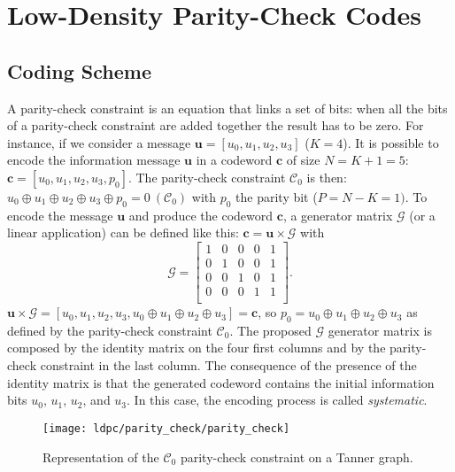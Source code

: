 \section{Low-Density Parity-Check Codes}

\subsection{Coding Scheme}

A parity-check constraint is an equation that links a set of bits: when all the
bits of a parity-check constraint are added together the result has to be
zero. For instance, if we consider a message $\bm{u} = [u_0, u_1, u_2, u_3]$
($K = 4$). It is possible to encode the information message $\bm{u}$ in a
codeword $\bm{c}$ of size $N = K + 1 = 5$: $\bm{c} = [u_0,u_1,u_2,u_3,p_0]$.
The parity-check constraint $\mathcal{C}_0$ is then: $u_0 \oplus u_1 \oplus u_2
\oplus u_3 \oplus p_0 = 0~(\mathcal{C}_0)$ with $p_0$ the parity bit ($P = N -
K = 1)$. To encode the message $\bm{u}$ and produce the codeword $\bm{c}$, a
generator matrix $\bm{\mathcal{G}}$ (or a linear application) can be defined
like this: $\bm{c} = \bm{u} \times \bm{\mathcal{G}}$ with
\begin{equation*}
\bm{\mathcal{G}} =
\begin{bmatrix}
1 & 0 & 0 & 0 & 1\\
0 & 1 & 0 & 0 & 1\\
0 & 0 & 1 & 0 & 1\\
0 & 0 & 0 & 1 & 1\\
\end{bmatrix}
.
\end{equation*}
$\bm{u} \times \bm{\mathcal{G}} = [u_0,u_1,u_2,u_3,u_0 \oplus u_1 \oplus u_2
\oplus u_3] = \bm{c}$, so $p_0 = u_0 \oplus u_1 \oplus u_2 \oplus u_3$ as
defined by the parity-check constraint $\mathcal{C}_0$. The proposed
$\bm{\mathcal{G}}$ generator matrix is composed by the identity matrix on the
four first columns and by the parity-check constraint in the last column.
The consequence of the presence of the identity matrix is that the generated
codeword contains the initial information bits $u_0$, $u_1$, $u_2$, and $u_3$.
In this case, the encoding process is called \emph{systematic}.

\begin{figure}[htp]
  \centering
  \texttt{[image: ldpc/parity\_check/parity\_check]}
  \caption{Representation of the $\mathcal{C}_0$ parity-check constraint on a
    Tanner graph.}
  \label{fig:alg_ldpc_parity_check}
\end{figure}

